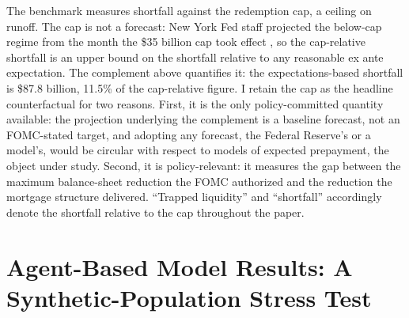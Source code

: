 \documentclass[12pt]{article}
\begin{document}
The benchmark measures shortfall against the redemption cap, a ceiling on runoff. The cap is not a forecast: New York Fed staff projected the below-cap regime from the month the \$35 billion cap took effect \citep{nyfed2022}, so the cap-relative shortfall is an upper bound on the shortfall relative to any reasonable ex ante expectation. The complement above quantifies it: the expectations-based shortfall is \$87.8 billion, 11.5\% of the cap-relative figure. I retain the cap as the headline counterfactual for two reasons. First, it is the only policy-committed quantity available: the projection underlying the complement is a baseline forecast, not an FOMC-stated target, and adopting any forecast, the Federal Reserve's or a model's, would be circular with respect to models of expected prepayment, the object under study. Second, it is policy-relevant: it measures the gap between the maximum balance-sheet reduction the FOMC authorized and the reduction the mortgage structure delivered. ``Trapped liquidity'' and ``shortfall'' accordingly denote the shortfall relative to the cap throughout the paper.
\section{Agent-Based Model Results: A Synthetic-Population Stress Test}\label{sec:abm}
\end{document}
